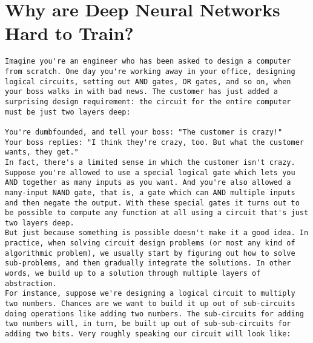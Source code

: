 
\chapter{Why are Deep Neural Networks Hard to Train?}
\label{sec:WhyAreDeepNeuralNetworksHardToTrain?}





\begin{lstlisting}
Imagine you're an engineer who has been asked to design a computer from scratch. One day you're working away in your office, designing logical circuits, setting out AND gates, OR gates, and so on, when your boss walks in with bad news. The customer has just added a surprising design requirement: the circuit for the entire computer must be just two layers deep:

You're dumbfounded, and tell your boss: "The customer is crazy!"
Your boss replies: "I think they're crazy, too. But what the customer wants, they get."
In fact, there's a limited sense in which the customer isn't crazy. Suppose you're allowed to use a special logical gate which lets you AND together as many inputs as you want. And you're also allowed a many-input NAND gate, that is, a gate which can AND multiple inputs and then negate the output. With these special gates it turns out to be possible to compute any function at all using a circuit that's just two layers deep.
But just because something is possible doesn't make it a good idea. In practice, when solving circuit design problems (or most any kind of algorithmic problem), we usually start by figuring out how to solve sub-problems, and then gradually integrate the solutions. In other words, we build up to a solution through multiple layers of abstraction. 
For instance, suppose we're designing a logical circuit to multiply two numbers. Chances are we want to build it up out of sub-circuits doing operations like adding two numbers. The sub-circuits for adding two numbers will, in turn, be built up out of sub-sub-circuits for adding two bits. Very roughly speaking our circuit will look like:


\end{lstlisting}
